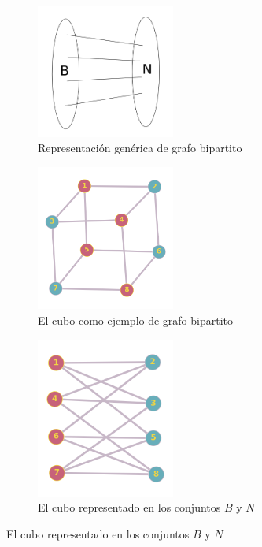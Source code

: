\documentclass[a4paper,1pt]{report}
\begin{document}
\begin{figure}[H]
    \centering
    \begin{subfigure}[b]{0.45\textwidth}
    \centering
    \includegraphics[width=0.5\textwidth]{figures/bipartitoBN.png}
    \caption{Representaci\'on gen\'erica de grafo bipartito}
    \end{subfigure}
    \begin{subfigure}[b]{0.45\textwidth}
        \centering
    \includegraphics[width=0.5\textwidth]{figures/cubo.png}
    \caption{El cubo como ejemplo de grafo bipartito}
    \end{subfigure}
    \begin{subfigure}[b]{0.45\textwidth}
        \centering
    \includegraphics[width=0.5\textwidth]{figures/cuboBipartito.png}
    \caption{El cubo representado en los conjuntos $B$ y $N$}
    \end{subfigure}
\end{figure} 
\end{document}
